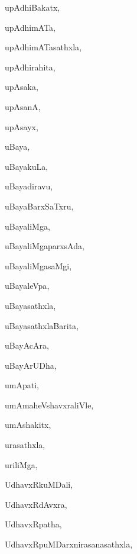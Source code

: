 \begin{multicols}{3}
{\noindent
{upAdhiBakatx}, \pageref{upAdhiBakatx}

\noindent
{upAdhimATa}, \pageref{upAdhimATa}

\noindent
{upAdhimATasathxla}, \pageref{upAdhimATasathxla}

\noindent
{upAdhirahita}, \pageref{upAdhirahita}

\noindent
{upAsaka}, \pageref{upAsaka}

\noindent
{upAsanA}, \pageref{upAsanA}

\noindent
{upAsayx}, \pageref{upAsayx}

\noindent
{uBaya}, \pageref{uBaya}

\noindent
{uBayakuLa}, \pageref{uBayakuLa}

\noindent
{uBayadiravu}, \pageref{uBayadiravu}

\noindent
{uBayaBarxSaTxru}, \pageref{uBayaBarxSaTxru}

\noindent
{uBayaliMga}, \pageref{uBayaliMga}

\noindent
{uBayaliMgaparxsAda}, \pageref{uBayaliMgaparxsAda}

\noindent
{uBayaliMgasaMgi}, \pageref{uBayaliMgasaMgi}

\noindent
{uBayaleVpa}, \pageref{uBayaleVpa}

\noindent
{uBayasathxla}, \pageref{uBayasathxla}

\noindent
{uBayasathxlaBarita}, \pageref{uBayasathxlaBarita}

\noindent
{uBayAcAra}, \pageref{uBayAcAra}

\noindent
{uBayArUDha}, \pageref{uBayArUDha}

\noindent
{umApati}, \pageref{umApati}

\noindent
{umAmaheVshavxraliVle}, \pageref{umAmaheVshavxraliVle}

\noindent
{umAshakitx}, \pageref{umAshakitx}

\noindent
{urasathxla}, \pageref{urasathxla}

\noindent
{uriliMga}, \pageref{uriliMga}

\bigskip
\noindent
{}
\smallskip

\noindent
{UdhavxRkuMDali}, \pageref{UdhavxRkuMDali}

\noindent
{UdhavxRdAvxra}, \pageref{UdhavxRdAvxra}

\noindent
{UdhavxRpatha}, \pageref{UdhavxRpatha}

\noindent
{UdhavxRpuMDarxnirasanasathxla}, \pageref{UdhavxRpuMDarxnirasanasathxla}

}
\end{multicols}
